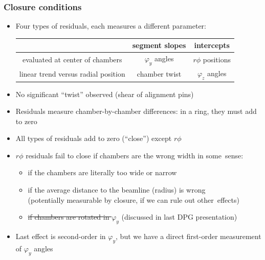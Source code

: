 \documentclass[compress]{beamer}
\begin{document}
\begin{frame}
\frametitle{Closure conditions}
\begin{itemize}
\item Four types of residuals, each measures a different parameter:

\renewcommand{\arraystretch}{1.3}

\begin{tabular}{c | c c}
& segment slopes & intercepts \\\hline
evaluated at center of chambers & $\varphi_y$ angles & $r\phi$ positions \\
linear trend versus radial position & chamber twist & $\varphi_z$ angles \\
\end{tabular}

\item No significant ``twist'' observed (shear of alignment pins)

\item Residuals measure chamber-by-chamber differences: in a ring, they must add to zero

\item All types of residuals add to zero (``close'') except $r\phi$

\item $r\phi$ residuals fail to close if chambers are the wrong width in \mbox{some sense:\hspace{-1 cm}}

\begin{itemize}
\item if the chambers are literally too wide or narrow
\item if the average distance to the beamline (radius) is wrong \\ (potentially measurable by closure, if we can rule out \mbox{other effects)\hspace{-1 cm}}
\item \sout{if chambers are rotated in $\varphi_y$} {\scriptsize (discussed in last DPG presentation)}
\end{itemize}

\item Last effect is second-order in $\varphi_y$, but we have a direct first-order measurement of $\varphi_y$ angles
\end{itemize}
\end{frame}
\end{document}
